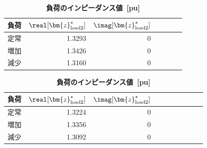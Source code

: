 \documentclass[tombow,dvipdfmx]{corona-a5-1.1}
\begin{document}
\begin{table}[h]
\medskip
 \centering
  {
  \begin{minipage}{0.49\linewidth}
  \caption{\textbf{Impedance value of load~[pu]}} \label{table:loadpara1}
    \centering
  \begin{tabular}{crrrccc}
   \hline
負荷 &  $\real [\bm{z}_{{\rm load}2}^{\star}]$ & $\imag [\bm{z}_{{\rm load}2}^{\star}]$ \\
   \hline \hline
   定常 & 1.3293 & 0 \\
   増加 & 1.3426 & 0 \\
   減少 & 1.3160 & 0 \\
   \hline
  \end{tabular}
  \end{minipage}
  \begin{minipage}{0.49\linewidth}
  \caption{\textbf{負荷のインピーダンス値~[pu]}} \label{table:loadpara2}
    \centering
  \begin{tabular}{crrrrccccc}
   \hline
負荷 &  $\real [\bm{z}_{{\rm load}2}^{\star}]$ & $\imag [\bm{z}_{{\rm load}2}^{\star}]$ \\
   \hline \hline
   定常 & 1.3224 & 0\\
   増加 & 1.3356 & 0 \\
   減少 & 1.3092 & 0 \\
   \hline
  \end{tabular}
  \end{minipage}
  }
\end{table}
\end{document}
